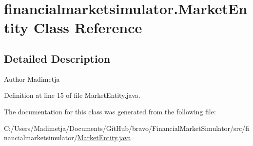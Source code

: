 \hypertarget{classfinancialmarketsimulator_1_1_market_entity}{\section{financialmarketsimulator.\+Market\+Entity Class Reference}
\label{classfinancialmarketsimulator_1_1_market_entity}
}


\subsection{Detailed Description}
\begin{DoxyAuthor}{Author}
Madimetja 
\end{DoxyAuthor}


Definition at line 15 of file Market\+Entity.\+java.



The documentation for this class was generated from the following file\+:\begin{DoxyCompactItemize}
\item 
C\+:/\+Users/\+Madimetja/\+Documents/\+Git\+Hub/bravo/\+Financial\+Market\+Simulator/src/financialmarketsimulator/\hyperlink{_market_entity_8java}{Market\+Entity.\+java}\end{DoxyCompactItemize}
